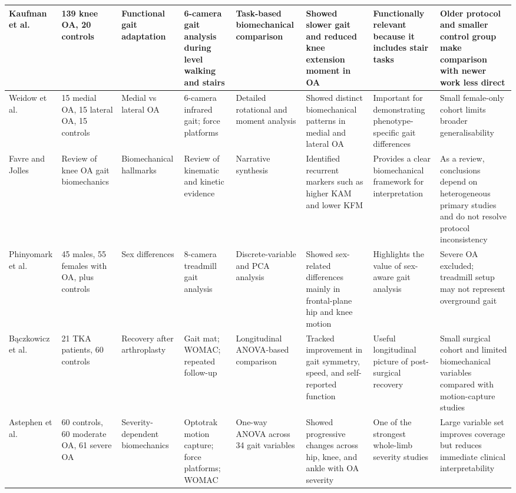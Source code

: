 \documentclass[12pt]{elsarticle}
\begin{document}
{\begin{longtable}{p{1.9cm} p{1.6cm} p{1.9cm} p{1.9cm} p{1.7cm} p{1.9cm} p{2.0cm} p{3.0cm}}
Kaufman et al. \cite{kaufman2001gait}
& 139 knee OA, 20 controls
& Functional gait adaptation
& 6-camera gait analysis during level walking and stairs
& Task-based biomechanical comparison
& Showed slower gait and reduced knee extension moment in OA
& Functionally relevant because it includes stair tasks
& Older protocol and smaller control group make comparison with newer work less direct \\
\hline

Weidow et al. \cite{weidow2006hip}
& 15 medial OA, 15 lateral OA, 15 controls
& Medial vs lateral OA
& 6-camera infrared gait; force platforms
& Detailed rotational and moment analysis
& Showed distinct biomechanical patterns in medial and lateral OA
& Important for demonstrating phenotype-specific gait differences
& Small female-only cohort limits broader generalisability \\
\hline

Favre and Jolles \cite{favre2016gait}
& Review of knee OA gait biomechanics
& Biomechanical hallmarks
& Review of kinematic and kinetic evidence
& Narrative synthesis
& Identified recurrent markers such as higher KAM and lower KFM
& Provides a clear biomechanical framework for interpretation
& As a review, conclusions depend on heterogeneous primary studies and do not resolve protocol inconsistency \\
\hline

Phinyomark et al. \cite{phinyomark2016gender}
& 45 males, 55 females with OA, plus controls
& Sex differences
& 8-camera treadmill gait analysis
& Discrete-variable and PCA analysis
& Showed sex-related differences mainly in frontal-plane hip and knee motion
& Highlights the value of sex-aware gait analysis
& Severe OA excluded; treadmill setup may not represent overground gait \\
\hline

B{\k{a}}czkowicz et al. \cite{bkaczkowicz2018gait}
& 21 TKA patients, 60 controls
& Recovery after arthroplasty
& Gait mat; WOMAC; repeated follow-up
& Longitudinal ANOVA-based comparison
& Tracked improvement in gait symmetry, speed, and self-reported function
& Useful longitudinal picture of post-surgical recovery
& Small surgical cohort and limited biomechanical variables compared with motion-capture studies \\
\hline

Astephen et al. \cite{astephen2008biomechanical}
& 60 controls, 60 moderate OA, 61 severe OA
& Severity-dependent biomechanics
& Optotrak motion capture; force platforms; WOMAC
& One-way ANOVA across 34 gait variables
& Showed progressive changes across hip, knee, and ankle with OA severity
& One of the strongest whole-limb severity studies
& Large variable set improves coverage but reduces immediate clinical interpretability \\
\hline


\end{longtable}}
\end{document}
